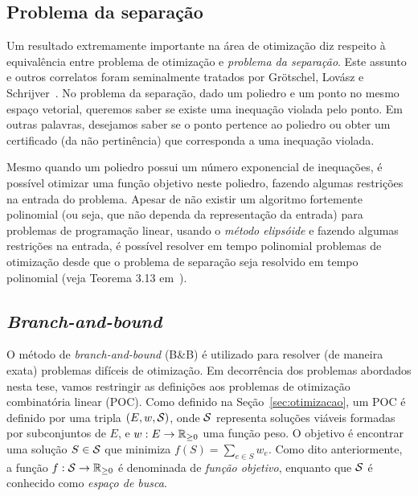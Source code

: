     
\subsection{Problema da separação}
Um resultado extremamente importante na área de otimização diz respeito à equivalência entre problema de otimização e \emph{problema da separação}.  Este assunto e outros correlatos foram seminalmente tratados por Grötschel, Lovász e Schrijver~\cite{GrotschelLS1988}.  No problema da separação, dado um poliedro e um ponto no mesmo espaço vetorial,
queremos saber se existe uma inequação violada pelo ponto.  Em outras palavras, desejamos saber se o ponto pertence ao poliedro ou obter um certificado (da não pertinência) que corresponda a uma inequação violada.

Mesmo quando um poliedro possui um número exponencial de inequações, é possível otimizar uma função objetivo neste poliedro, fazendo algumas restrições na entrada do problema. Apesar de não existir um algoritmo fortemente polinomial (ou seja, que não dependa da representação da entrada) para problemas de programação linear, usando o \emph{método elipsóide} e fazendo algumas restrições na entrada,  é possível resolver em tempo polinomial problemas de otimização desde que o problema de separação seja resolvido em tempo polinomial (veja Teorema 3.13 em~\cite{NemhauserW1999}).

\subsection{\emph{Branch-and-bound}}
\label{sec:branch_and_bound}
O método de \emph{branch-and-bound} (B\&B) é utilizado para resolver (de maneira exata) problemas difíceis de otimização.
Em decorrência dos problemas abordados nesta tese, vamos restringir as definições aos problemas de otimização combinatória linear (POC). Como definido na Seção~\ref{sec:otimizacao}, um POC é definido por uma tripla $(E, w, \mathcal{S})$, onde $\mathcal{S}$ representa soluções viáveis formadas por subconjuntos de $E$, e $w: E \to \mathbb{R}_{\ge 0}$ uma função peso.  O objetivo é encontrar uma solução $S \in \mathcal{S}$ que minimiza $f(S) = \sum_{e \in S} w_e$. Como dito anteriormente, a função $f: \mathcal{S} \to \mathbb{R}_{\ge 0}$ é denominada de \emph{função objetivo}, enquanto que $\mathcal{S}$ é conhecido como \emph{espaço de busca}.

